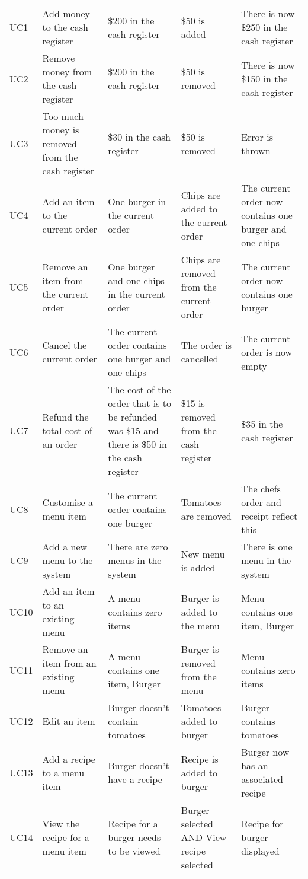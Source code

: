 
\begin{table}
	\centering
	\begin{tabular}{lllll}
		UC1 & Add money to the cash register & \$200 in the cash register & \$50 is added & There is now \$250 in the cash register \\
		UC2 & Remove money from the cash register & \$200 in the cash register & \$50 is removed & There is now \$150 in the cash register \\
		UC3 & Too much money is removed from the cash register & \$30 in the cash register & \$50 is removed & Error is thrown \\
		UC4 & Add an item to the current order & One burger in the current order & Chips are added to the current order & The current order now contains one burger and one chips \\
		UC5 & Remove an item from the current order & One burger and one chips in the current order & Chips are removed from the current order & The current order now contains one burger \\
		UC6 & Cancel the current order & The current order contains one burger and one chips & The order is cancelled & The current order is now empty \\
		UC7 & Refund the total cost of an order & The cost of the order that is to be refunded was \$15 and there is \$50 in the cash register & \$15 is removed from the cash register & \$35 in the cash register \\
		UC8 & Customise a menu item & The current order contains one burger & Tomatoes are removed & The chefs order and receipt reflect this \\
		UC9 & Add a new menu to the system & There are zero menus in the system & New menu is added & There is one menu in the system \\
		UC10 & Add an item to an existing menu & A menu contains zero items & Burger is added to the menu & Menu contains one item, Burger \\
		UC11 & Remove an item from an existing menu & A menu contains one item, Burger & Burger is removed from the menu & Menu contains zero items \\
		UC12 & Edit an item & Burger doesn't contain tomatoes & Tomatoes added to burger & Burger contains tomatoes \\
		UC13 & Add a recipe to a menu item & Burger doesn't have a recipe & Recipe is added to burger & Burger now has an associated recipe \\
		UC14 & View the recipe for a menu item & Recipe for a burger needs to be viewed & Burger selected AND View recipe selected & Recipe for burger displayed \\

\end{tabular}
\end{table}

